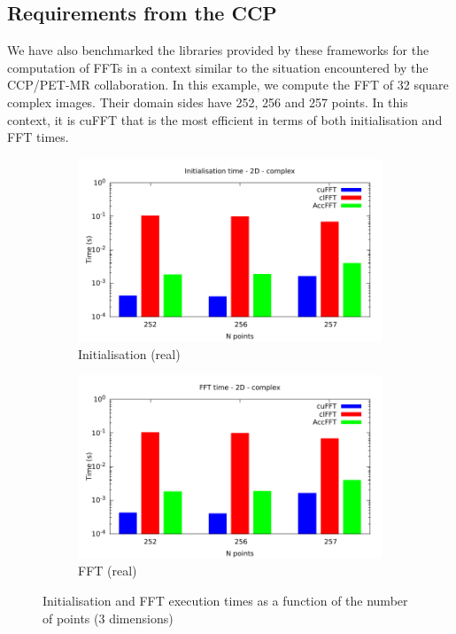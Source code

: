 \documentclass[12pt, a4paper]{article}
\begin{document}
\subsection{Requirements from the CCP}\label{CCPPETMR}
We have also benchmarked the libraries provided by these frameworks
for the computation of FFTs in a context similar to the situation
encountered by the CCP/PET-MR collaboration. In this example, we
compute the FFT of 32 square complex images. Their domain sides have
252, 256 and 257 points. In this context, it is cuFFT that is the most
efficient in terms of both initialisation and FFT times.
\begin{figure}[htb]
\captionsetup{width=0.8\linewidth}
\centering
\begin{subfigure}{.5\textwidth}
\centering
\includegraphics[width=.9\linewidth]{graphs/fft-ccppetmr-init.pdf}
\caption{Initialisation (real)}
\label{CCPPETMRDRI}
\end{subfigure}%
\begin{subfigure}{.5\textwidth}
\centering
\includegraphics[width=.9\linewidth]{graphs/fft-ccppetmr-exec.pdf}
\caption{FFT (real)}
\label{CCPPETMRRE}
\end{subfigure}
\caption{Initialisation and FFT execution times as a function of the number of points (3 dimensions)}
\label{CCPPETMRGRAPH}
\end{figure}
\end{document}
